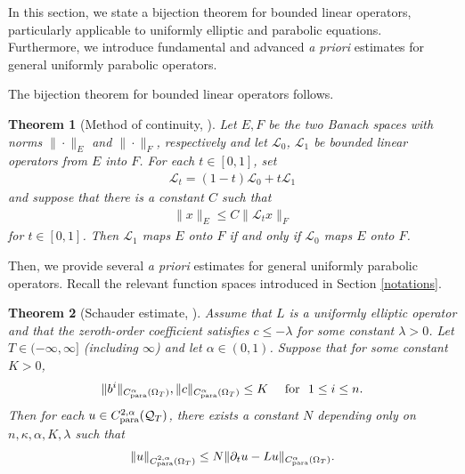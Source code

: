 \documentclass[reqno,11pt,final]{amsart}
\theoremstyle{plain}
\newtheorem{theorem}{Theorem}
\numberwithin{equation}{section}
\numberwithin{theorem}{section}
\begin{document}
In this section, we state a bijection theorem for bounded linear operators, particularly applicable to uniformly elliptic and parabolic equations. Furthermore, we introduce fundamental and advanced \textit{a priori} estimates for general uniformly parabolic operators. 

The bijection theorem for bounded linear operators follows. 
\begin{theorem}[Method of continuity, {\cite[Theorem 5.2]{Ell_Gilbarg_1998}}]\label{MoC}Let $E,F$ be the two Banach spaces with norms $\| \cdot\|_E$ and $\| \cdot\|_F$, respectively and let $\mathcal{L}_0$, $\mathcal{L}_1$ be bounded linear operators from $E$ into $F$. For each $t\in[0,1]$, set
\begin{align*}
\mathcal{L}_t = (1-t)\mathcal{L}_0 + t\mathcal{L}_1
\end{align*}and suppose that there is a constant $C$ such that
\begin{align*}
\lVert x\rVert_E \le C \lVert \mathcal{L}_tx\rVert_F
\end{align*}for $t\in[0,1]$. Then $\mathcal{L}_1$ maps $E$ onto $F$ if and only if $\mathcal{L}_0$ maps $E$ onto $F$.
\end{theorem}

Then, we provide several \textit{a priori} estimates for general uniformly parabolic operators. Recall the relevant function spaces introduced in Section \ref{notations}.
\begin{theorem}[Schauder estimate, {\cite[Theorem 8.10.1]{Ell_Krylov_1996}}]\label{Schauder} Assume that $L$ is a uniformly elliptic operator and that the zeroth-order coefficient satisfies $c\le-\lambda$ for some constant $\lambda>0$. Let $T\in(-\infty,\infty]$ (including $\infty$) and let $\alpha\in(0,1)$. Suppose that for some constant $K>0$,
\begin{align*}
\lVert b^i\rVert_{C_\textup{para}^\alpha(\Omega_T)}, \lVert c\rVert_{C_\textup{para}^\alpha(\Omega_T)} \le K \quad \textup{ for }\,\, 1\le i\le n.
\end{align*}Then for each $u\in C^{2,\alpha}_\textup{para}(\mathcal{Q}_T)$, there exists a constant $N$ depending only on $n, \kappa,\alpha, K,\lambda$ such that
\begin{align*}
\lVert u\rVert_{C_\textup{para}^{2,\alpha}(\Omega_T)} \le N\lVert \partial_tu - Lu\rVert_{C_\textup{para}^\alpha(\Omega_T)}.
\end{align*}
\end{theorem}
\end{document}

